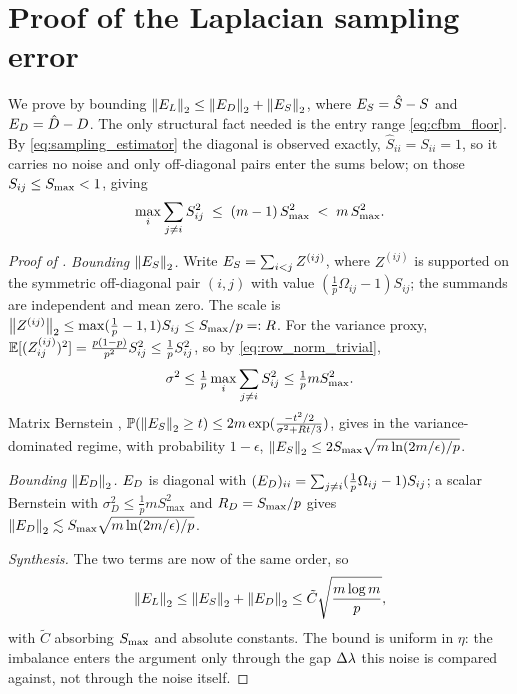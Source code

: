 \section{Proof of the Laplacian sampling error}\label{app:comp2}

We prove  by bounding
$\left\lVert E_{L} \right\rVert_{2}\le\left\lVert E_{D} \right\rVert_{2}+\left\lVert E_{S} \right\rVert_{2}$, where $E_{S}=\hat S-S$ and
$E_{D}=\hat D-D$. The only structural fact needed is the entry range
\eqref{eq:cfbm_floor}. By \eqref{eq:sampling_estimator} the diagonal is observed exactly,
$\hat S_{ii}=S_{ii}=1$, so it carries no noise and only off-diagonal pairs enter the
sums below; on those $S_{ij}\le S_{\max}<1$, giving
\begin{equation}\label{eq:row_norm_trivial}
   \max_i\sum_{j\ne i}S_{ij}^2\;\le\;(m-1)\,S_{\max}^2\;<\;m\,S_{\max}^2 .
\end{equation}

\begin{proof}[Proof of ]
\emph{Bounding $\left\lVert E_{S} \right\rVert_{2}$.} Write $E_{S}=\sum_{i<j}Z^{(ij)}$, where $Z^{(ij)}$
is supported on the symmetric off-diagonal pair $(i,j)$ with value
$(\tfrac1p\Omega_{ij}-1)S_{ij}$;
the summands are independent and mean zero. The scale is
$\left\lVert Z^{(ij)} \right\rVert_{2}\le\max(\tfrac1p-1,1)S_{ij}\le S_{\max}/p=:R$. For the variance proxy,
$\mathbb{E}[(Z^{(ij)}_{ij})^2]=\tfrac{p(1-p)}{p^2}S_{ij}^2\le\tfrac1pS_{ij}^2$, so by
\eqref{eq:row_norm_trivial},
\[
   \sigma^2\le\tfrac1p\max_i\sum_{j\ne i}S_{ij}^2\le\tfrac1p mS_{\max}^2 .
\]
Matrix Bernstein \cite{tropp2012userfriendly},
$\mathbb{P}(\left\lVert E_{S} \right\rVert_{2}\ge t)\le2m\exp(\tfrac{-t^2/2}{\sigma^2+Rt/3})$, gives in the
variance-dominated regime, with probability $1-\epsilon$,
$\left\lVert E_{S} \right\rVert_{2}\le2S_{\max}\sqrt{m\ln(2m/\epsilon)/p}$.

\emph{Bounding $\left\lVert E_{D} \right\rVert_{2}$.} $E_{D}$ is diagonal with
$(E_{D})_{ii}=\sum_{j\ne i}(\tfrac1p\Omega_{ij}-1)S_{ij}$; a scalar Bernstein with
$\sigma_D^2\le\tfrac1p mS_{\max}^2$ and $R_D=S_{\max}/p$ gives
$\left\lVert E_{D} \right\rVert_{2}\lesssim S_{\max}\sqrt{m\ln(2m/\epsilon)/p}$.

\emph{Synthesis.} The two terms are now of the same order, so
\[
   \left\lVert E_{L} \right\rVert_{2}\le\left\lVert E_{S} \right\rVert_{2}+\left\lVert E_{D} \right\rVert_{2}\le\tilde C\sqrt{\frac{m\log m}{p}},
\]
with $\tilde C$ absorbing $S_{\max}$ and absolute constants. The bound is uniform in
$\eta$: the imbalance enters the argument only through the gap $\Delta\lambda$ this noise
is compared against, not through the noise itself.
\end{proof}
